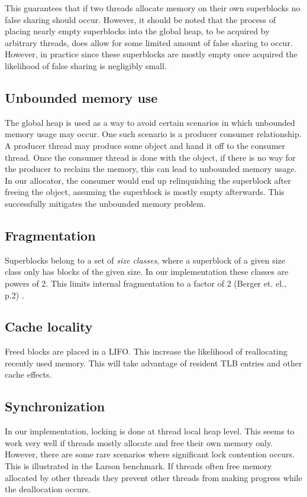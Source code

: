 \documentclass[oneside]{amsart}
\theoremstyle{definition}
\theoremstyle{remark}
\numberwithin{equation}{section}
\begin{document}
This guarantees that if two threads allocate memory on their own superblocks no false sharing should
occur. However, it should be noted that the process of placing nearly empty superblocks into the
global heap, to be acquired by arbitrary threads, does allow for some limited amount of false
sharing to occur. However, in practice since these superblocks are mostly empty once acquired the
likelihood of false sharing is negligibly small.

\subsection{Unbounded memory use}
The global heap is used as a way to avoid certain scenarios in which unbounded memory usage may
occur. One such scenario is a producer consumer relationship. A producer thread may produce some
object and hand it off to the consumer thread. Once the consumer thread is done with the object, if
there is no way for the producer to reclaim the memory, this can lead to unbounded memory usage.
In our allocator, the consumer would end up relinquishing the superblock after freeing the object,
assuming the superblock is mostly empty afterwards. This successfully mitigates the unbounded memory
problem.

\subsection{Fragmentation}
Superblocks belong to a set of \textit{size classes}, where a superblock of a given size class only
has blocks of the given size. In our implementation these classes are powers of 2. This limits
internal fragmentation to a factor of 2 (Berger et. el., p.2) \cite{Berger:2000:HSMa}.

\subsection{Cache locality}
Freed blocks are placed in a LIFO. This increase the likelihood of reallocating recently used
memory. This will take advantage of resident TLB entries and other cache effects.

\subsection{Synchronization}
In our implementation, locking is done at thread local heap level. This seems to work very well if
threads mostly allocate and free their own memory only. However, there are some rare scenarios where
significant lock contention occurs. This is illustrated in the Larson benchmark. If threads often
free memory allocated by other threads they prevent other threads from making progress while the
deallocation occurs.
\end{document}
